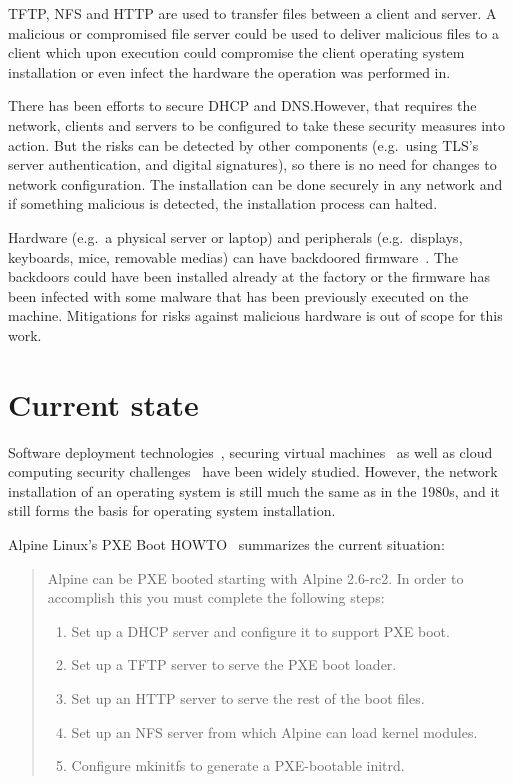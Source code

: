 TFTP, NFS and HTTP are used to transfer files between a client and
server. A malicious or compromised file server could be used to
deliver malicious files to a client which upon execution could
compromise the client operating system installation or even infect the
hardware the operation was performed in.

There has been efforts to secure DHCP and DNS.\@ However, that
requires the network, clients and servers to be configured to take
these security measures into action. But the risks can be detected by
other components (e.g.\ using TLS's server authentication, and digital
signatures), so there is no need for changes to network
configuration. The installation can be done securely in any network
and if something malicious is detected, the installation process can
halted.


Hardware (e.g.\ a physical server or laptop) and peripherals (e.g.\
displays, keyboards, mice, removable medias) can have backdoored
firmware~\cite{swierczynski2016interdiction}. The backdoors could have
been installed already at the factory or the firmware has been
infected with some malware that has been previously executed on the
machine. Mitigations for risks against malicious hardware is out of
scope for this work.


\section{Current state}

Software deployment technologies~\cite{SoftDep}, securing virtual
machines~\cite{Garfinkel2005} as well as cloud computing security
challenges~\cite{Owens2010}\cite{Hashizume2013} have been widely
studied. However, the network installation of an operating system is
still much the same as in the 1980s, and it still forms the basis for
operating system installation.

Alpine Linux's PXE Boot HOWTO~\cite{alpine-pxe-boot-howto} summarizes
the current situation:

\begin{quote}
Alpine can be PXE booted starting with Alpine 2.6-rc2. In order to
accomplish this you must complete the following steps:

\begin{enumerate}
\item Set up a DHCP server and configure it to support PXE boot.
\item Set up a TFTP server to serve the PXE boot loader.
\item Set up an HTTP server to serve the rest of the boot files.
\item Set up an NFS server from which Alpine can load kernel modules.
\item Configure mkinitfs to generate a PXE-bootable initrd.
\end{enumerate}
\end{quote}

